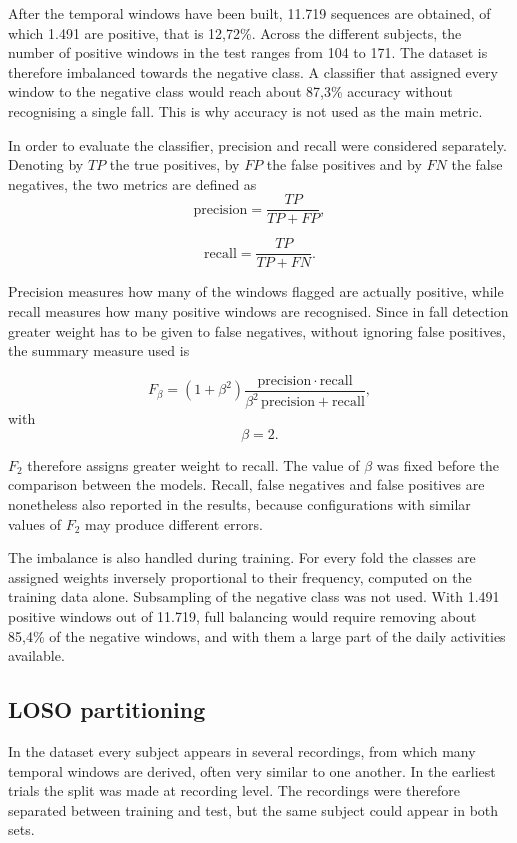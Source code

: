 After the temporal windows have been built, 11.719 sequences are obtained, of which 1.491 are positive, that is 12,72\%. Across the different subjects, the number of positive windows in the test ranges from 104 to 171. The dataset is therefore imbalanced towards the negative class. A classifier that assigned every window to the negative class would reach about 87,3\% accuracy without recognising a single fall. This is why accuracy is not used as the main metric.

In order to evaluate the classifier, precision and recall were considered separately. Denoting by $TP$ the true positives, by $FP$ the false positives and by $FN$ the false negatives, the two metrics are defined as
\[
\mathrm{precision}
=
\frac{TP}{TP+FP},
\]

\[
\mathrm{recall}
=
\frac{TP}{TP+FN}.
\]

Precision measures how many of the windows flagged are actually positive, while recall measures how many positive windows are recognised.
Since in fall detection greater weight has to be given to false negatives, without ignoring false positives, the summary measure used is

\[
F_\beta =
(1+\beta^2)
\frac{\mathrm{precision}\cdot\mathrm{recall}}
     {\beta^2\,\mathrm{precision}+\mathrm{recall}},
\]
with
\[
\beta=2.
\]

$F_2$ therefore assigns greater weight to recall. The value of $\beta$ was fixed before the comparison between the models. Recall, false negatives and false positives are nonetheless also reported in the results, because configurations with similar values of $F_2$ may produce different errors.

The imbalance is also handled during training. For every fold the classes are assigned weights inversely proportional to their frequency, computed on the training data alone.
Subsampling of the negative class was not used. With 1.491 positive windows out of 11.719, full balancing would require removing about 85,4\% of the negative windows, and with them a large part of the daily activities available.

\subsection{LOSO partitioning}
\label{sec:loso}

In the dataset every subject appears in several recordings, from which many temporal windows are derived, often very similar to one another.
In the earliest trials the split was made at recording level. The recordings were therefore separated between training and test, but the same subject could appear in both sets.

